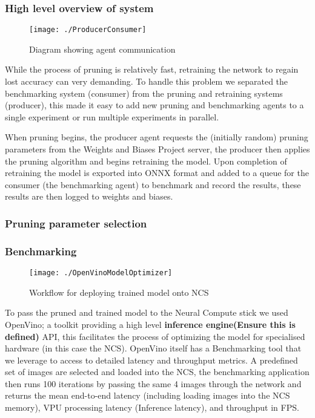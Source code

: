 \documentclass[../Dissertation.tex]{subfiles}
\begin{document}
\subsubsection{High level overview of system}

\begin{figure}[H]
    \centering
    \texttt{[image: ./ProducerConsumer]}
    \caption{Diagram showing agent communication}
    \label{fig:agentCommunication}
\end{figure}

While the process of pruning is relatively fast, retraining the network to regain lost accuracy can very demanding. To handle this problem we separated the benchmarking system (consumer) from the pruning and retraining systems (producer), this made it easy to add new pruning and benchmarking agents to a single experiment or run multiple experiments in parallel.

When pruning begins, the producer agent requests the (initially random) pruning parameters from the Weights and Biases Project server, the producer then applies the pruning algorithm and begins retraining the model. Upon completion of retraining the model is exported into ONNX format and added to a queue for the consumer (the benchmarking agent) to benchmark and record the results, these results are then logged to weights and biases.

\subsubsection{Pruning parameter selection}


\subsubsection{Benchmarking}

\begin{figure}[H]
	\centering
	\texttt{[image: ./OpenVinoModelOptimizer]}
	\caption{Workflow for deploying trained model onto NCS \autocite{ModelOptimizerDeveloper}}
	\label{fig:OpenVinoWorkflow}
\end{figure}


To pass the pruned and trained model to the Neural Compute stick we used OpenVino; a toolkit providing a high level \textbf{inference engine(Ensure this is defined)} API, this facilitates the process of optimizing the model for specialised hardware (in this case the NCS). 
OpenVino itself has a Benchmarking tool that we leverage to access to detailed latency and throughput metrics. A predefined set of images are selected and loaded into the NCS, the benchmarking application then runs 100 iterations by passing the same 4 images through the network and returns the mean end-to-end latency (including loading images into the NCS memory), VPU processing latency (Inference latency), and throughput in FPS.
\end{document}
